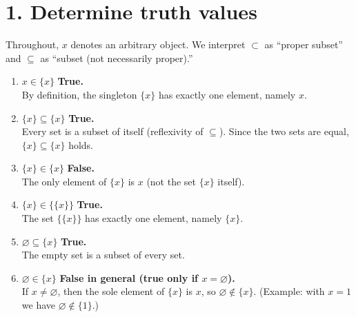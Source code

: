 \section*{1. Determine truth values}
Throughout, \(x\) denotes an arbitrary object. We interpret \(\subset\) as ``proper subset'' and \(\subseteq\) as ``subset (not necessarily proper).''

\begin{enumerate}[label=(\alph*),leftmargin=*]

\item \(x \in \{x\}\) \quad \textbf{True.}\\
By definition, the singleton \(\{x\}\) has exactly one element, namely \(x\).

\item $\{x\} \subseteq \{x\}$ \quad \textbf{True.}\\
Every set is a subset of itself (reflexivity of $\subseteq$). Since the two sets are equal,
$\{x\}\subseteq\{x\}$ holds.

\item \(\{x\} \in \{x\}\) \quad \textbf{False.}\\
The only element of \(\{x\}\) is \(x\) (not the set \(\{x\}\) itself).

\item \(\{x\} \in \{\{x\}\}\) \quad \textbf{True.}\\
The set \(\{\{x\}\}\) has exactly one element, namely \(\{x\}\).

\item \(\varnothing \subseteq \{x\}\) \quad \textbf{True.}\\
The empty set is a subset of every set.

\item \(\varnothing \in \{x\}\) \quad \textbf{False in general (true only if \(x=\varnothing\)).}\\
If \(x\neq\varnothing\), then the sole element of \(\{x\}\) is \(x\), so \(\varnothing\notin\{x\}\).
(Example: with \(x=1\) we have \(\varnothing\notin\{1\}\).)

\end{enumerate}